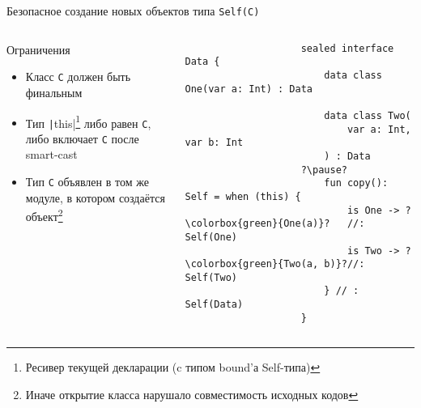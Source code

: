 \documentclass[handout,aspectratio=169,usenames,dvipsnames]{beamer}
\begin{document}
    \begin{frame}[fragile]{Безопасное создание новых объектов типа \texttt{Self(C)}}
        \begin{columns}[onlytextwidth]
            \begin{column}[t]{0.46\textwidth}
                \begin{block}{Ограничения}
                    \begin{itemize}
                        \item Класс \texttt{C} должен быть финальным
                        \item Тип \texttt|this|\footnote{Ресивер текущей декларации (c типом bound'а Self-типа)} либо равен \texttt{С}, либо включает \texttt{C} после smart-cast
                        \item Тип \texttt{C} объявлен в том же модуле, в котором создаётся объект\footnote{Иначе открытие класса нарушало совместимость исходных кодов}
                    \end{itemize}
                \end{block}
            \end{column}\hfill%
            \begin{column}[t]{0.50\textwidth}
                \pause
                \begin{verbatim}
                    sealed interface Data {
                        data class One(var a: Int) : Data

                        data class Two(
                            var a: Int, var b: Int
                        ) : Data
                    ?\pause?
                        fun copy(): Self = when (this) {
                            is One -> ?\colorbox{green}{One(a)}?   //: Self(One)
                            is Two -> ?\colorbox{green}{Two(a, b)}?//: Self(Two)
                        } // : Self(Data)
                    }
                \end{verbatim}
            \end{column}
        \end{columns}
    \end{frame}
\end{document}

